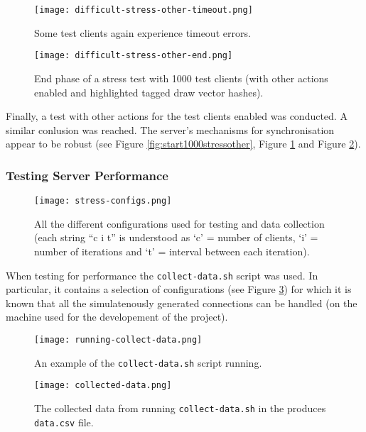 \documentclass[article]{uom-coursework}
\begin{document}
\begin{figure}[H]
\centering
\texttt{[image: difficult-stress-other-timeout.png]}
\caption{Some test clients again experience timeout errors.}
\label{fig:timeout1000stressother}
\end{figure}

\begin{figure}[H]
\centering
\texttt{[image: difficult-stress-other-end.png]}
\caption{End phase of a stress test with 1000 test clients (with
other actions enabled and highlighted tagged draw vector
hashes).}
\label{fig:end1000stressother}
\end{figure}

Finally, a test with other actions for the test clients enabled
was conducted. A similar conlusion was reached. The server's
mechanisms for synchronisation appear to be robust (see Figure
\ref{fig:start1000stressother}, Figure
\ref{fig:timeout1000stressother} and Figure
\ref{fig:end1000stressother}).

\subsubsection{Testing Server Performance}

\begin{figure}[H]
\centering
\texttt{[image: stress-configs.png]}
\caption{All the different configurations used for testing and
data collection (each string  ``c i t'' is understood as `c' =
number of clients, `i' = number of iterations and `t' = interval
between each iteration).}
\label{fig:stressconfigs}
\end{figure}

When testing for performance the \texttt{collect-data.sh} script
was used. In particular, it contains a selection of
configurations (see Figure \ref{fig:stressconfigs}) for which it
is known that all the simulatenously generated connections can
be handled (on the machine used for the developement of the
project).

\begin{figure}[H]
\centering
\texttt{[image: running-collect-data.png]}
\caption{An example of the \texttt{collect-data.sh} script
running.}
\label{fig:runningcollectdata}
\end{figure}

\begin{figure}[H]
\centering
\texttt{[image: collected-data.png]}
\caption{The collected data from running
\texttt{collect-data.sh} in the produces \texttt{data.csv}
file.}
\label{fig:collecteddata}
\end{figure}
\end{document}
